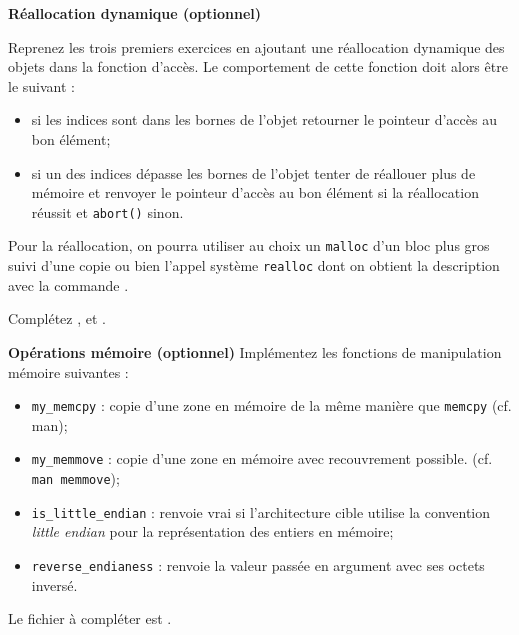 \documentclass[10pt]{article}\usepackage[enonce]{exemptty}
\begin{document}
\begin{Exercice} \textbf{Réallocation dynamique (optionnel)}

  Reprenez les trois premiers exercices en ajoutant une réallocation dynamique
  des objets dans la fonction d'accès. Le comportement de cette fonction doit
  alors être le suivant :
  \begin{itemize}
  \item si les indices sont dans les bornes de l'objet retourner le pointeur
    d'accès au bon élément;
  \item si un des indices dépasse les bornes de l'objet tenter de réallouer
    plus de mémoire et renvoyer le pointeur d'accès au bon élément si la
    réallocation réussit et \verb~abort()~ sinon.
  \end{itemize}
  
  Pour la réallocation, on pourra utiliser au choix un \texttt{malloc} d'un
  bloc plus gros suivi d'une copie ou bien l'appel système \texttt{realloc}
  dont on obtient la description avec la commande .

  Complétez ,  et
  .
\end{Exercice}

\begin{Exercice}\textbf{Opérations mémoire (optionnel)}
Implémentez les fonctions de manipulation mémoire suivantes :
\begin{itemize}
\item \texttt{my\_memcpy} : copie d'une zone en mémoire de la même manière que
  \texttt{memcpy} (cf. man);
\item \texttt{my\_memmove} : copie d'une zone en mémoire avec recouvrement
  possible.  (cf. \texttt{man memmove});
\item \texttt{is\_little\_endian} : renvoie vrai si l'architecture cible
  utilise la convention \textit{little endian} pour la représentation des entiers en
  mémoire;
\item \texttt{reverse\_endianess} : renvoie la valeur passée en argument avec
  ses octets inversé.
\end{itemize}
  Le fichier à compléter est . 
\end{Exercice}
\end{document}
